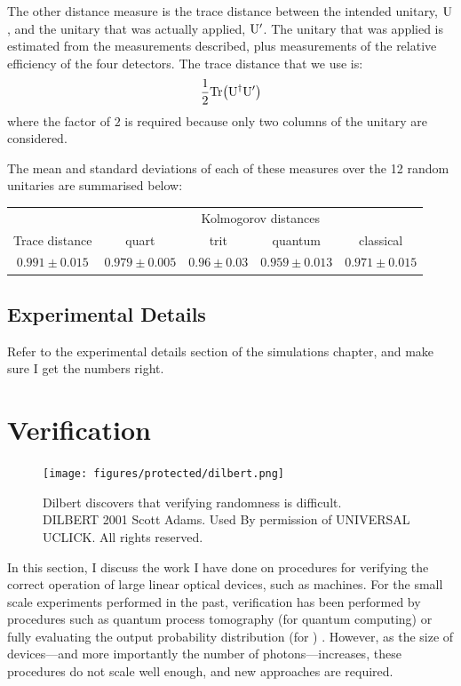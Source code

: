 The other distance measure is the trace distance between the intended unitary,
\(\mathrm{U}\), and the unitary that was actually applied, \(\mathrm{U}^{\prime}\).
The unitary that was applied is estimated from the measurements described, plus
measurements of the relative efficiency of the four detectors. The trace
distance that we use is:
\begin{equation}
  \frac{1}{2} \mathrm{Tr} \!\left( \mathrm{U}^{\dagger} \mathrm{U}^{\prime} \right)
\end{equation}
where the factor of \(2\) is required because only two columns of the unitary
are considered.

The mean and standard deviations of each of these measures over the 12 random
unitaries are summarised below:

\begin{tabular}{|c|c|c|c|c|}
  \hline
  & \multicolumn{4}{|c|}{Kolmogorov distances} \\
  \cline{2-5}
  Trace distance & quart & trit & quantum & classical \\
  \hline
  \(0.991 \pm 0.015\) & \(0.979 \pm 0.005\) & \(0.96 \pm 0.03\) & \(0.959 \pm
  0.013\) & \(0.971 \pm 0.015\) \\
  \hline
\end{tabular}

\subsection{Experimental Details}
\label{sec:BenchmarkingExperiment}
Refer to the experimental details section of the simulations chapter, and make
sure I get the numbers right.

\section{Verification}
\label{sec:Verification}
\begin{figure}[t]
  \centering
  \texttt{[image: figures/protected/dilbert.png]}
  \caption[Dilbert discovers that verifying randomness is difficult.]
  {Dilbert discovers that verifying randomness is difficult.\\DILBERT
  \textcopyright{} 2001 Scott Adams. Used By permission of UNIVERSAL UCLICK. All
  rights reserved.}
  \label{fig:dilbert}
\end{figure}
In this section, I discuss the work I have done on procedures for verifying the
correct operation of large linear optical devices, such as \bosonsampling{}
machines. For the small scale experiments performed in the past, verification
has been performed by procedures such as quantum process tomography (for
quantum computing)  or fully evaluating the output
probability distribution (for \bosonsampling{}) . However, as the size of devices---and more importantly the number
of photons---increases, these procedures do not scale well enough, and new
approaches are required.

